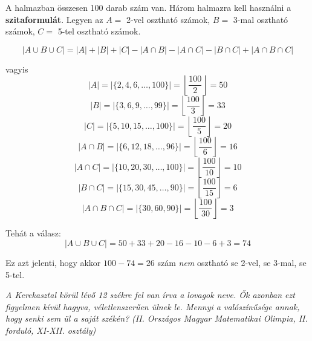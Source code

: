 \begin{solution}
A halmazban összesen 100 darab szám van. Három halmazra kell használni
a \textbf{szitaformulát}. Legyen az $A=$ 2-vel osztható számok, $B=$
3-mal osztható számok, $C=$ 5-tel osztható számok.

\[
|A\cup B\cup C|=|A|+|B|+|C|-|A\cap B|-|A\cap C|-|B\cap C|+|A\cap B\cap C|
\]

vagyis 
\[
|A|=|\{2,4,6,\dots,100\}|=\left\lfloor \frac{100}{2}\right\rfloor =50
\]
\[
|B|=|\{3,6,9,\dots,99\}|=\left\lfloor \frac{100}{3}\right\rfloor =33
\]
\[
|C|=|\{5,10,15,\dots,100\}|=\left\lfloor \frac{100}{5}\right\rfloor =20
\]
\[
|A\cap B|=|\{6,12,18,\dots,96\}|=\left\lfloor \frac{100}{6}\right\rfloor =16
\]
\[
|A\cap C|=|\{10,20,30,\dots,100\}|=\left\lfloor \frac{100}{10}\right\rfloor =10
\]
\[
|B\cap C|=|\{15,30,45,\dots,90\}|=\left\lfloor \frac{100}{15}\right\rfloor =6
\]
\[
|A\cap B\cap C|=|\{30,60,90\}|=\left\lfloor \frac{100}{30}\right\rfloor =3
\]

Tehát a válasz: 
\[
|A\cup B\cup C|=50+33+20-16-10-6+3=74
\]

Ez azt jelenti, hogy akkor $100-74=26$ szám \emph{nem} osztható se
2-vel, se 3-mal, se 5-tel.
\end{solution}
\begin{extraproblem}
\textit{\emph{A Kerekasztal körül lévő 12 székre fel van írva a lovagok
neve. Ők azonban ezt figyelmen kívül hagyva, véletlenszerűen ülnek
le. Mennyi a valószínűsége annak, hogy senki sem ül a saját székén?
}}\textit{(II. Országos Magyar Matematikai Olimpia, II. forduló, XI-XII.
osztály)}
\end{extraproblem}

